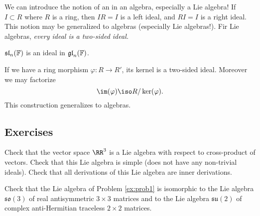 We can introduce the notion of an  in an algebra,
especially a Lie algebra! If $I\subset R$ where $R$ is a ring,
then $IR=I$ is a left ideal, and $RI=I$ is a right ideal. This
notion may be generalized to algebras (especially Lie
algebras!). Fir Lie algebras, \emph{every ideal is a two-sided
  ideal.}

\begin{prop}
$\frak{sl}_{n}(\Bbb{F})$ is an ideal in $\frak{gl}_{n}(\Bbb{F})$.
\end{prop}

If we have a ring morphism $\varphi\colon R\to R'$, its kernel is
a two-sided ideal. Moreover we may factorize
\begin{equation}
\im(\varphi)\iso R/\ker(\varphi).
\end{equation}
This construction generalizes to algebras.

\subsection{Exercises}
\begin{exercise}\label{ex:prob1}
Check that the vector space $\RR^{3}$ is a Lie algebra with respect to cross-product of vectors. Check that this Lie algebra is simple (does not have any non-trivial ideals). Check that all derivations of this Lie algebra are inner derivations.
\end{exercise}
\begin{exercise}
Check that the Lie algebra of Problem \ref{ex:prob1} is isomorphic to the Lie algebra $\mathfrak{so}(3)$ of real antisymmetric $3\times3$ matrices and to the Lie algebra $\mathfrak{su}(2)$ of complex anti-Hermitian traceless $2\times2$ matrices.
\end{exercise}
